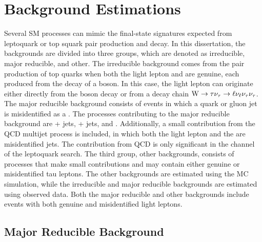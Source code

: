 \section{Background Estimations
\label{sec:background}}

Several SM processes can mimic the final-state signatures expected from leptoquark or top squark pair production and decay. In this dissertation, the backgrounds are divided into three groups, which are denoted as \ttbar irreducible, major reducible, and other. The \ttbar irreducible background comes from the pair production of top quarks when both the light lepton and \tauh are genuine, each produced from the decay of a \W boson. In this case, the light lepton can originate either directly from the \W boson decay or from a decay chain $\mathrm{W} \rightarrow \tau  \nu_{\tau} \rightarrow \ell\nu_{\ell} \nu_{\tau} \nu_{\tau}$. The major reducible background consists of events in which a quark or gluon jet is
misidentified as a \tauh. The processes contributing to the major reducible background are \W + jets, \Z + jets, and \ttbar. Additionally, a small contribution from the QCD multijet process is included, in which both the light lepton and the \tauh are misidentified jets. The contribution from QCD is only significant in the \etau channel of the leptoquark search. The third group, other backgrounds, consists of processes that make small contributions and may contain either genuine or misidentified tau leptons. The other backgrounds are estimated using the MC simulation, while the \ttbar irreducible and major reducible backgrounds are estimated using observed data. Both the major reducible and other backgrounds include events with both genuine and misidentified light leptons.




\subsection{Major Reducible Background}


